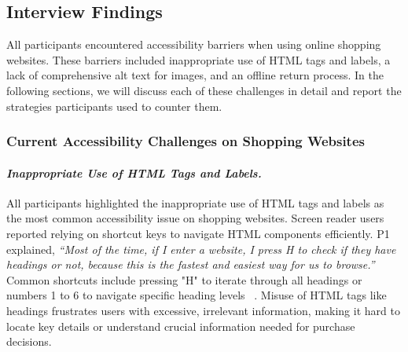 
\subsection{Interview Findings}
All participants encountered accessibility barriers when using online shopping websites. These barriers included inappropriate use of HTML tags and labels, a lack of comprehensive alt text for images, and an offline return process. In the following sections, we will discuss each of these challenges in detail and report the strategies participants used to counter them.

\subsubsection{Current Accessibility Challenges on Shopping Websites}

\paragraph{\textbf{\textit{Inappropriate Use of HTML Tags and Labels.}}}
All participants highlighted  the inappropriate use of HTML tags and labels as the most common accessibility issue on shopping websites. Screen reader users reported relying on shortcut keys to navigate HTML components efficiently. P1 explained, \textit{``Most of the time, if I enter a website, I press H to check if they have headings or not, because this is the fastest and easiest way for us to browse.''} Common shortcuts include pressing "H" to iterate through all headings or numbers 1 to 6 to navigate specific heading levels ~\cite{yu2023design, kaushik2023guardlens, webaim_screen_reader_survey_10}. Misuse of HTML tags like headings frustrates users with excessive, irrelevant information, making it hard to locate key details or understand crucial information needed for purchase decisions.

